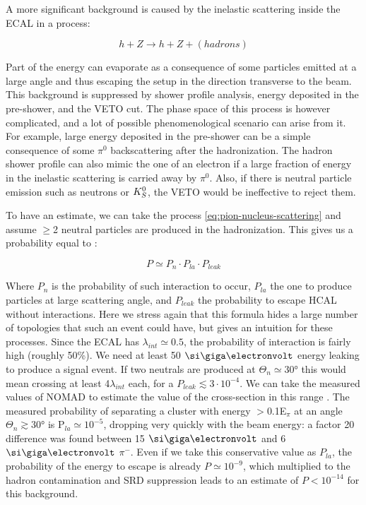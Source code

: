 A more significant background is caused by the inelastic scattering inside the ECAL in a process:

\begin{equation}
  \label{eq:pion-nucleus-scattering}
  h + Z \longrightarrow h + Z + (hadrons)
\end{equation}

Part of the energy can evaporate as a consequence of some particles emitted at a large angle and thus escaping the setup in the direction transverse to the beam. This background is suppressed by shower profile analysis, energy deposited in the pre-shower, and the VETO cut. The phase space of this process is however complicated, and a lot of possible phenomenological scenario can arise from it. For example, large energy deposited in the pre-shower can be a simple consequence of some $\pi^0$ backscattering after the hadronization. The hadron shower profile can also mimic the one of an electron if a large fraction of energy in the inelastic scattering is carried away by $\pi^0$. Also, if there is neutral particle emission such as neutrons or $K^0_S$, the VETO would be ineffective to reject them.

To have an estimate, we can take the process \ref{eq:pion-nucleus-scattering} and assume $\geq$2 neutral particles are produced in the hadronization. This gives us a probability equal to \cite{gkkk1}:

\begin{equation}
  \label{eq:transverse-leak-estimate}
  P \simeq P_n \cdot P_{la} \cdot P_{leak}
\end{equation}

Where $P_n$ is the probability of such interaction to occur, $P_{la}$ the one to produce particles at large scattering angle, and $P_{leak}$ the probability to escape HCAL without interactions. Here we stress again that this formula hides a large number of topologies that such an event could have, but gives an intuition for these processes. Since the ECAL has $\lambda_{int} \simeq 0.5$, the probability of interaction is fairly high (roughly 50\%). We need at least 50 $\gev$ energy leaking to produce a signal event. If two neutrals are produced at $\Theta_{n} \simeq 30$\si{\degree} this would mean crossing at least 4$\lambda_{int}$ each, for a $P_{leak} \lesssim 3 \cdot 10^{-4}$. We can take the measured values of NOMAD to estimate the value of the cross-section in this range \cite{AUTIERO1998285,GNINENKO1998583}. The measured probability of separating a cluster with energy $>$0.1E$_{\pi}$ at an angle $\Theta_{n} \gtrsim 30$\si{\degree} is P$_{la} \simeq 10^{-5}$, dropping very quickly with the beam energy: a factor 20 difference was found between 15 $\gev$ and 6 $\gev$ $\pi^-$. Even if we take this conservative value as $P_{la}$, the probability of the energy to escape is already $P\simeq 10^{-9}$, which multiplied to the hadron contamination and SRD suppression leads to an estimate of $P<10^{-14}$ for this background.

